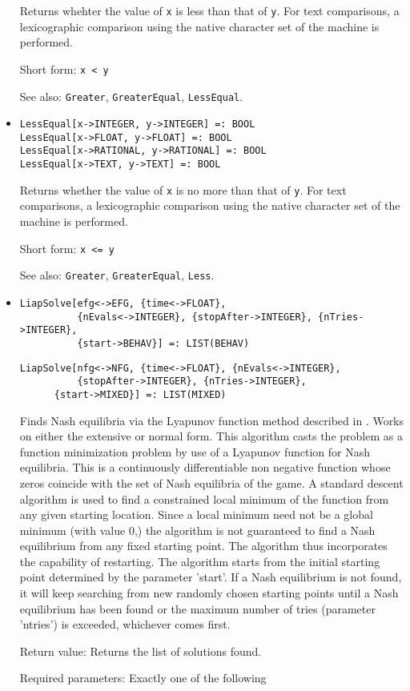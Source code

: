 \begin{itemize}
\bd
Returns whehter the value of \verb+x+ is less than that of
\verb+y+.  For text comparisons, a lexicographic comparison using the
native character set of the machine is performed.
\item
[Short form:] \verb+x < y+
\item
[See also:] {\tt Greater}, {\tt GreaterEqual}, {\tt LessEqual}.
\ed

\item
\protect \large \begin{verbatim}
LessEqual[x->INTEGER, y->INTEGER] =: BOOL
LessEqual[x->FLOAT, y->FLOAT] =: BOOL
LessEqual[x->RATIONAL, y->RATIONAL] =: BOOL
LessEqual[x->TEXT, y->TEXT] =: BOOL
\end{verbatim}\normalsize

\bd
Returns whether the value of \verb+x+ is no more than that
of \verb+y+.  For text comparisons, a lexicographic comparison using the
native character set of the machine is performed.
\item
[Short form:] \verb+x <= y+
\item
[See also:] {\tt Greater}, {\tt GreaterEqual}, {\tt Less}.
\ed

\item
\protect \large \begin{verbatim}
LiapSolve[efg<->EFG, {time<->FLOAT},
          {nEvals<->INTEGER}, {stopAfter->INTEGER}, {nTries->INTEGER},
          {start->BEHAV}] =: LIST(BEHAV)
\end{verbatim}\normalsize

\protect \large \begin{verbatim}
LiapSolve[nfg<->NFG, {time<->FLOAT}, {nEvals<->INTEGER},
          {stopAfter->INTEGER}, {nTries->INTEGER},
	  {start->MIXED}] =: LIST(MIXED)
\end{verbatim}\normalsize


\bd
\item
[] Finds Nash equilibria via the Lyapunov function method
described in \cite[1991]{McK:91}.  Works on either the
extensive or normal form.  This algorithm casts the problem as a
function minimization problem by use of a Lyapunov function for Nash
equilibria.  This is a continuously differentiable non negative
function whose zeros coincide with the set of Nash equilibria of the
game.  A standard descent algorithm is used to find a constrained
local minimum of the function from any given starting location.  Since
a local minimum need not be a global minimum (with value 0,) the
algorithm is not guaranteed to find a Nash equilibrium from any fixed
starting point.  The algorithm thus incorporates the capability of
restarting.  The algorithm starts from the initial starting point
determined by the parameter 'start'.  If a Nash equilibrium is not
found, it will keep searching from new randomly chosen starting points
until a Nash equilibrium has been found or the maximum number of tries
(parameter 'ntries') is exceeded, whichever comes first.
\item
[Return value:] Returns the list of solutions found.
\item
[Required parameters:] Exactly one of the following \hfil\null


\end{itemize}
